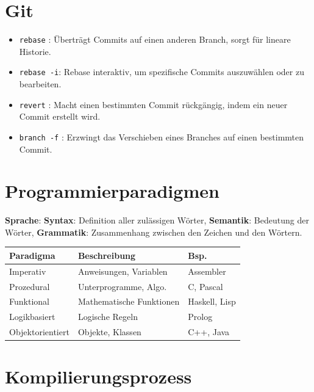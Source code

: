 \documentclass[8pt, landscape]{article}
\newcommand{\algo}[1]{\textbf{\textcolor{blue!60!black}{#1}}}
\begin{document}
\setlength{\columnsep}{4pt}
\begin{multicols*}{4}

\section{Git}

\begin{itemize} 
    \item \lstinline|rebase| : Überträgt Commits auf einen anderen Branch, sorgt für lineare Historie.
    \item \lstinline|rebase -i|: Rebase interaktiv, um spezifische Commits auszuwählen oder zu bearbeiten.
    \item \lstinline|revert| : Macht einen bestimmten Commit rückgängig, indem ein neuer Commit erstellt wird.
    \item \lstinline|branch -f| : Erzwingt das Verschieben eines Branches auf einen bestimmten Commit.
\end{itemize}

\section{Programmierparadigmen}

\algo{Sprache}: \textbf{Syntax}: Definition aller zulässigen Wörter, \textbf{Semantik}: Bedeutung der Wörter, \textbf{Grammatik}:  Zusammenhang zwischen den Zeichen und den Wörtern.

\noindent

\begin{center}
\begin{tabularx}{0.9\columnwidth}{l X l}
\toprule
\textbf{Paradigma} & \textbf{Beschreibung} & \textbf{Bsp.} \\
\midrule
Imperativ & Anweisungen, Variablen & Assembler \\
Prozedural & Unterprogramme, Algo. & C, Pascal \\
Funktional & Mathematische Funktionen & Haskell, Lisp \\
Logikbasiert & Logische Regeln & Prolog \\
Objektorientiert & Objekte, Klassen & C++, Java \\
\bottomrule
\end{tabularx}
\end{center}


\section{Kompilierungsprozess}


\end{multicols*}
\end{document}
